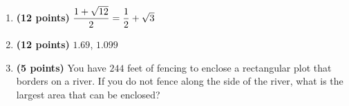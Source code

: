 \documentclass[12pt]{amsart}
\begin{document}
\begin{enumerate}
\vfill 
\def \a{7}\def \atwoone{1}\def \atwotwo{-2}\def \atwothree{5}\def \btwothree{8}\def \sumtwothree{13}\def \diftwothree{-3}\def \bigtwothree{500}\def \powtwothree{32768}\def \logtwothree{0.7739760316291208}\def \factortwothree{85}\def \atwofour{1.12}\def \btwofour{1.114}\def \tooshorttwofour{10.1}\def \moneytwofour{10.10}\def \longertwofour{10.10000}\def \atwofive{0.12}\def \btwofive{0.12346}\def \athreeone{5}\def \bthreeone{6}\def \setthreetwo{[12, 6, 9]}\def \athreetwo{12}\def \bthreetwo{6}\def \cthreetwo{9}\def \controlthreethree{-8}\def \athreethree{3}\def \topthreethree{1}\def \athreefour{3}\def \bthreefour{5}\def \listthreefour{[1, 2, 4, 5]}\def \afourone{16}\def \bfourone{4}\def \fracfourone{4}\def \rootfourtwo{12}\def \simplifiedfourtwo{2 \sqrt{3}}\def \sqrtlistfourtwo{[2, 3]}\def \outfourtwo{2}\def \infourtwo{3}\def \wowfourtwo{1}\def \afourthree{0}\def \nicethreefour{3x^{2}-x^{}}\def \nastythreefour{xyz^{3}}\def \cfourthree{4}\def \dfourthree{-10}\def \infourthree{4x^{}}\def \outfourthree{-10y^{}}\def \afourfour{1274076}\def \nicefourfour{1,274,076}\def \goodfourfour{1,000,000.12345}\def \badfourfour{1,000,000.1}
\item {\bf (12 points)} 
 $\dfrac{1+\sqrt{\rootfourtwo}}{2} = \dfrac{1}{2} + \ifthenelse{\wowfourtwo = 1}{}{\wowfourtwo} \sqrt{\infourtwo}$

\vfill 
\def \a{7}\def \atwoone{1}\def \atwotwo{3}\def \atwothree{5}\def \btwothree{7}\def \sumtwothree{12}\def \diftwothree{-2}\def \bigtwothree{500}\def \powtwothree{16807}\def \logtwothree{0.8270874753469162}\def \factortwothree{187}\def \atwofour{1.69}\def \btwofour{1.099}\def \tooshorttwofour{10.1}\def \moneytwofour{10.10}\def \longertwofour{10.10000}\def \atwofive{0.12}\def \btwofive{0.12346}\def \athreeone{5}\def \bthreeone{6}\def \setthreetwo{[3, 7, 7]}\def \athreetwo{3}\def \bthreetwo{7}\def \cthreetwo{7}\def \controlthreethree{4}\def \athreethree{1}\def \topthreethree{1}\def \athreefour{5}\def \bthreefour{4}\def \listthreefour{[1, 2, 3, 4]}\def \afourone{12}\def \bfourone{-2}\def \fracfourone{-6}\def \rootfourtwo{20}\def \simplifiedfourtwo{2 \sqrt{5}}\def \sqrtlistfourtwo{[2, 5]}\def \outfourtwo{2}\def \infourtwo{5}\def \wowfourtwo{1}\def \afourthree{0}\def \nicethreefour{3x^{2}-x^{}}\def \nastythreefour{xyz^{3}}\def \cfourthree{-4}\def \dfourthree{-10}\def \infourthree{-4x^{}}\def \outfourthree{-10y^{}}\def \afourfour{1456961}\def \nicefourfour{1,456,961}\def \goodfourfour{1,000,000.12345}\def \badfourfour{1,000,000.1}
\item {\bf (12 points)} 
 $\atwofour$, $\btwofour$ 
\vfill 
\newpage\def \x{61}\def \y{122}\def \L{244}\def \area{7442}
\item {\bf (5 points)} 
 You have $\L$ feet of fencing to enclose a rectangular plot that borders on a river. If you do not fence along the side of the river, what is the largest area that can be enclosed? \\


\end{enumerate}
\end{document}
